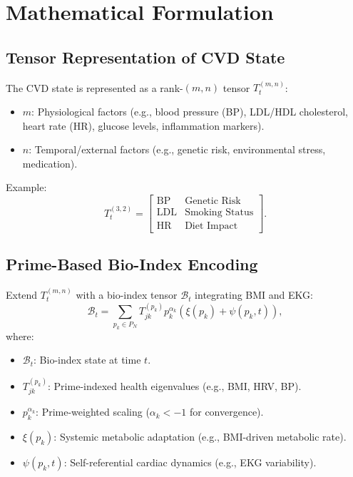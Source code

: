 \documentclass{article}
\theoremstyle{plain}
\theoremstyle{claimstyle}
\begin{document}
\section{Mathematical Formulation}

\subsection{Tensor Representation of CVD State}
The CVD state is represented as a rank-$(m, n)$ tensor \( T_t^{(m, n)} \):
\begin{itemize}
    \item \( m \): Physiological factors (e.g., blood pressure (BP), LDL/HDL cholesterol, heart rate (HR), glucose levels, inflammation markers).
    \item \( n \): Temporal/external factors (e.g., genetic risk, environmental stress, medication).
\end{itemize}
Example:
\[
T_t^{(3, 2)} = \begin{bmatrix}
\text{BP} & \text{Genetic Risk} \\
\text{LDL} & \text{Smoking Status} \\
\text{HR} & \text{Diet Impact}
\end{bmatrix}.
\]

\subsection{Prime-Based Bio-Index Encoding}
Extend \( T_t^{(m, n)} \) with a bio-index tensor \( \mathcal{B}_t \) integrating BMI and EKG:
\begin{equation}
\mathcal{B}_t = \sum_{p_k \in P_N} T_{jk}^{(p_k)} p_k^{\alpha_k} (\xi(p_k) + \psi(p_k, t)),
\end{equation}
where:
\begin{itemize}
    \item \( \mathcal{B}_t \): Bio-index state at time \( t \).
    \item \( T_{jk}^{(p_k)} \): Prime-indexed health eigenvalues (e.g., BMI, HRV, BP).
    \item \( p_k^{\alpha_k} \): Prime-weighted scaling (\( \alpha_k < -1 \) for convergence).
    \item \( \xi(p_k) \): Systemic metabolic adaptation (e.g., BMI-driven metabolic rate).
    \item \( \psi(p_k, t) \): Self-referential cardiac dynamics (e.g., EKG variability).
\end{itemize}
\end{document}
